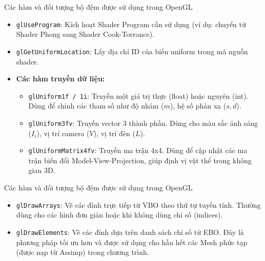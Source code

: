 \documentclass[11pt, aspectratio=169]{beamer}
\begin{document}
\begin{frame}{Các hàm và đối tượng bộ đệm được sử dụng trong OpenGL}
	\begin{itemize}
		\item \texttt{glUseProgram}: Kích hoạt Shader Program cần sử dụng (ví dụ: chuyển từ Shader Phong sang Shader Cook-Torrance).
		\item \texttt{glGetUniformLocation}: Lấy địa chỉ ID của biến uniform trong mã nguồn shader.
		\item \textbf{Các hàm truyền dữ liệu:}
		\begin{itemize}
			\item \texttt{glUniform1f / 1i}: Truyền một giá trị thực (float) hoặc nguyên (int). Dùng để chỉnh các tham số như độ nhám ($m$), hệ số phản xạ ($s, d$).
			\item \texttt{glUniform3fv}: Truyền vector 3 thành phần. Dùng cho màu sắc ánh sáng ($I_i$), vị trí camera ($V$), vị trí đèn ($L$).
			\item \texttt{glUniformMatrix4fv}: Truyền ma trận 4x4. Dùng để cập nhật các ma trận biến đổi Model-View-Projection, giúp định vị vật thể trong không gian 3D.
		\end{itemize}
	\end{itemize}
\end{frame}

\begin{frame}{Các hàm và đối tượng bộ đệm được sử dụng trong OpenGL}
	\begin{itemize}
		\item \texttt{glDrawArrays}: Vẽ các đỉnh trực tiếp từ VBO theo thứ tự tuyến tính. Thường dùng cho các hình đơn giản hoặc khi không dùng chỉ số (indices).
		\item \texttt{glDrawElements}: Vẽ các đỉnh dựa trên danh sách chỉ số từ EBO. Đây là phương pháp tối ưu hơn và được sử dụng cho hầu hết các Mesh phức tạp (được nạp từ Assimp) trong chương trình.
	\end{itemize}
\end{frame}
\end{document}
